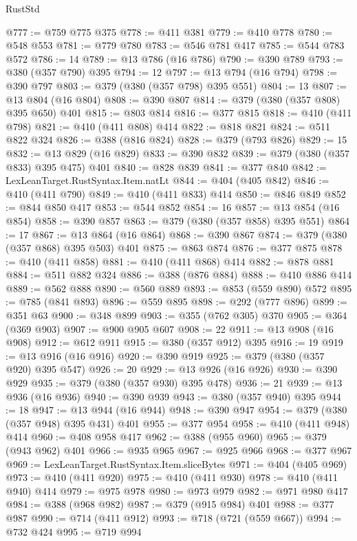 \begin{lexlean}{RustStd}
\begin{coremodule}
@777 := @759 @775 @375
@778 := @411 @381
@779 := @410 @778
@780 := @548 @553
@781 := @779 @780
@783 := @546 @781 @417
@785 := @544 @783 @572
@786 := 14
@789 := @13 @786 (@16 @786)
@790 := @390 @789
@793 := @380 (@357 @790) @395
@794 := 12
@797 := @13 @794 (@16 @794)
@798 := @390 @797
@803 := @379 (@380 (@357 @798) @395 @551)
@804 := 13
@807 := @13 @804 (@16 @804)
@808 := @390 @807
@814 := @379 (@380 (@357 @808) @395 @650) @401
@815 := @803 @814
@816 := @377 @815
@818 := @410 (@411 @798)
@821 := @410 (@411 @808) @414
@822 := @818 @821
@824 := @511 @822 @324
@826 := @388 (@816 @824)
@828 := @379 (@793 @826)
@829 := 15
@832 := @13 @829 (@16 @829)
@833 := @390 @832
@839 := @379 (@380 (@357 @833) @395 @475) @401
@840 := @828 @839
@841 := @377 @840
@842 := LexLeanTarget.RustSyntax.Item.natLt
@844 := @404 (@405 @842)
@846 := @410 (@411 @790)
@849 := @410 (@411 @833) @414
@850 := @846 @849
@852 := @844 @850 @417
@853 := @544 @852
@854 := 16
@857 := @13 @854 (@16 @854)
@858 := @390 @857
@863 := @379 (@380 (@357 @858) @395 @551)
@864 := 17
@867 := @13 @864 (@16 @864)
@868 := @390 @867
@874 := @379 (@380 (@357 @868) @395 @503) @401
@875 := @863 @874
@876 := @377 @875
@878 := @410 (@411 @858)
@881 := @410 (@411 @868) @414
@882 := @878 @881
@884 := @511 @882 @324
@886 := @388 (@876 @884)
@888 := @410 @886 @414
@889 := @562 @888
@890 := @560 @889
@893 := @853 (@559 @890) @572
@895 := @785 (@841 @893)
@896 := @559 @895
@898 := @292 (@777 @896)
@899 := @351 @63
@900 := @348 @899
@903 := @355 (@762 @305) @370
@905 := @364 (@369 @903)
@907 := @900 @905 @607
@908 := 22
@911 := @13 @908 (@16 @908)
@912 := @612 @911
@915 := @380 (@357 @912) @395
@916 := 19
@919 := @13 @916 (@16 @916)
@920 := @390 @919
@925 := @379 (@380 (@357 @920) @395 @547)
@926 := 20
@929 := @13 @926 (@16 @926)
@930 := @390 @929
@935 := @379 (@380 (@357 @930) @395 @478)
@936 := 21
@939 := @13 @936 (@16 @936)
@940 := @390 @939
@943 := @380 (@357 @940) @395
@944 := 18
@947 := @13 @944 (@16 @944)
@948 := @390 @947
@954 := @379 (@380 (@357 @948) @395 @431) @401
@955 := @377 @954
@958 := @410 (@411 @948) @414
@960 := @408 @958 @417
@962 := @388 (@955 @960)
@965 := @379 (@943 @962) @401
@966 := @935 @965
@967 := @925 @966
@968 := @377 @967
@969 := LexLeanTarget.RustSyntax.Item.sliceBytes
@971 := @404 (@405 @969)
@973 := @410 (@411 @920)
@975 := @410 (@411 @930)
@978 := @410 (@411 @940) @414
@979 := @975 @978
@980 := @973 @979
@982 := @971 @980 @417
@984 := @388 (@968 @982)
@987 := @379 (@915 @984) @401
@988 := @377 @987
@990 := @714 (@411 @912)
@993 := @718 (@721 (@559 @667))
@994 := @732 @424
@995 := @719 @994

\end{coremodule}
\end{lexlean}
